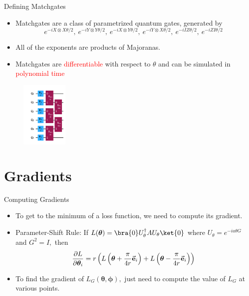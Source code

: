 \documentclass[xcolor=dvipsnames]{beamer}
\begin{document}
\begin{frame}{Defining Matchgates}
  \begin{itemize}
    \item Matchgates are a class of parametrized quantum gates, generated by 
    $$e^{-iX\otimes X\theta/2},~e^{-iY\otimes Y\theta/2},~e^{-iX\otimes Y\theta/2},~e^{-iY\otimes X\theta/2},~e^{-iIZ\theta/2},~e^{-iZI\theta/2}$$
    \item All of the exponents are products of Majoranas.
    \item Matchgates are \textcolor{red}{differentiable} with respect to $\theta$ and can be simulated in \textcolor{red}{polynomial time} 
  \end{itemize}

  \begin{figure}
    \centering
    \includegraphics[width=0.2\textwidth]{output.png}
  \end{figure}
\end{frame}

\section{Gradients}
\begin{frame}{Computing Gradients}
  \begin{itemize}
    \item To get to the minimum of a loss function, we need to compute its gradient.
    \item Parameter-Shift Rule: If $L(\bm{\theta})=\bra{0}U_\theta^\dagger AU_\theta\ket{0}$ where $U_\theta=e^{-ia\theta G}$ and $G^2=I,$ then
    \[\frac{\partial L}{\partial\bm{\theta}_i}=r\left(L\left(\bm{\theta}+\frac{\pi}{4r}\vec{\bf{e}}_i\right)+L\left(\bm{\theta}-\frac{\pi}{4r}\vec{\bf{e}}_i\right)\right)\]
    \item To find the gradient of $L_G(\bm{\theta},\bm{\phi}),$ just need to compute the value of $L_G$ at various points.
  \end{itemize}
\end{frame}
\end{document}
